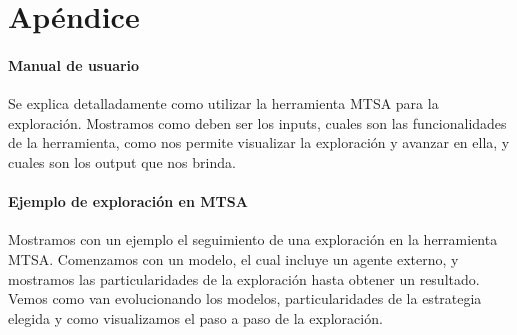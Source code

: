 \chapter{Apéndice}

\subsubsection{Manual de usuario}

Se explica detalladamente como utilizar la herramienta MTSA para la exploración.
Mostramos como deben ser los inputs, cuales son las funcionalidades de la herramienta, como nos permite visualizar 
la exploración y avanzar en ella, y cuales son los output que nos brinda.

\subsubsection{Ejemplo de exploración en MTSA}

Mostramos con un ejemplo el seguimiento de una exploración en la herramienta MTSA.
Comenzamos con un modelo, el cual incluye un agente externo, y mostramos las particularidades de la exploración hasta obtener un resultado.
Vemos como van evolucionando los modelos, particularidades de la estrategia elegida y como visualizamos el paso a paso de la exploración.

